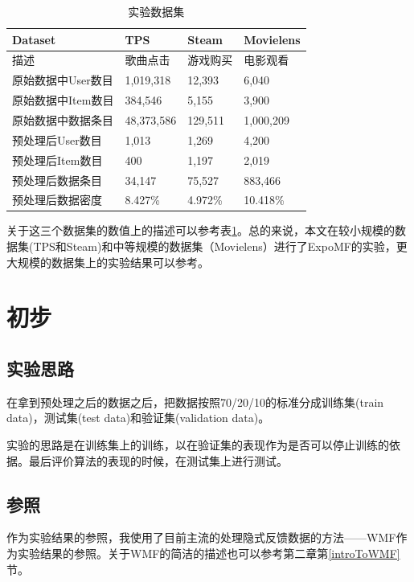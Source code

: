 \documentclass[notitlepage,cs4size,punct,oneside]{ctexrep}
\numberwithin{equation}{chapter}
\theoremstyle{mystyle}
\begin{document}
\begin{table}[htbp]\centering
\begin{tabular}{llll}
\hline\hline
Dataset             & TPS           & Steam     & Movielens \\
\hline
描述   				& 歌曲点击        & 游戏购买       & 电影观看      \\
原始数据中User数目     & 1,019,318     & 12,393        & 6,040       \\
原始数据中Item数目     & 384,546       & 5,155         & 3,900       \\
原始数据中数据条目      & 48,373,586    & 129,511       & 1,000,209       \\
预处理后User数目       & 1,013         & 1,269         & 4,200      \\
预处理后Item数目       & 400           & 1,197         & 2,019      \\
预处理后数据条目        & 34,147        & 75,527        & 883,466       \\
预处理后数据密度		 & 8.427\%       & 4.972\%       & 10.418\%     \\
\hline
\end{tabular}
\caption{实验数据集}\label{tab:dataset}
\end{table}

\par
关于这三个数据集的数值上的描述可以参考表\ref{tab:dataset}。总的来说，本文在较小规模的数据集(TPS和Steam)和中等规模的数据集（Movielens）进行了ExpoMF的实验，更大规模的数据集上的实验结果可以参考\cite{EXPOMF}。

\section{初步}


\subsection{实验思路}
在拿到预处理之后的数据之后，把数据按照70/20/10的标准分成训练集(train data)，测试集(test data)和验证集(validation data)。

实验的思路是在训练集上的训练，以在验证集的表现作为是否可以停止训练的依据。最后评价算法的表现的时候，在测试集上进行测试。

\subsection{参照}
作为实验结果的参照，我使用了目前主流的处理隐式反馈数据的方法——WMF\cite{WMF}作为实验结果的参照。关于WMF的简洁的描述也可以参考第二章第\ref{introToWMF}节。
\end{document}
